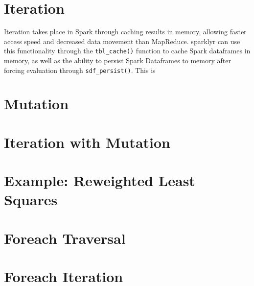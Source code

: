 \documentclass[10pt,a4paper]{article}
\begin{document}
\section{Iteration}

Iteration takes place in Spark through caching results in memory, allowing
faster access speed and decreased data movement than MapReduce.
sparklyr can use this functionality through the \texttt{tbl\_cache()} function
to cache Spark dataframes in memory, as well as the ability to persist Spark
Dataframes to memory after forcing evaluation through \texttt{sdf\_persist()}.
This is 

\section{Mutation}

\section{Iteration with Mutation}

\section{Example: Reweighted Least Squares}

\section{Foreach Traversal}

\section{Foreach Iteration}\label{sec:for-iter}

\printbibliography{}
\end{document}
